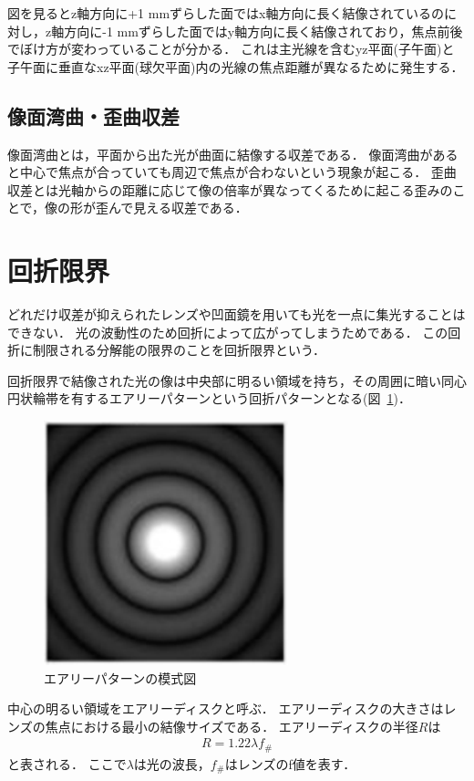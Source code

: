 図を見るとz軸方向に+1 mmずらした面ではx軸方向に長く結像されているのに対し，z軸方向に-1 mmずらした面ではy軸方向に長く結像されており，焦点前後でぼけ方が変わっていることが分かる．
これは主光線を含むyz平面(子午面)と子午面に垂直なxz平面(球欠平面)内の光線の焦点距離が異なるために発生する．

\subsection{像面湾曲・歪曲収差}
像面湾曲とは，平面から出た光が曲面に結像する収差である．
像面湾曲があると中心で焦点が合っていても周辺で焦点が合わないという現象が起こる．
歪曲収差とは光軸からの距離に応じて像の倍率が異なってくるために起こる歪みのことで，像の形が歪んで見える収差である\cite{nikon}．



\section{回折限界}
どれだけ収差が抑えられたレンズや凹面鏡を用いても光を一点に集光することはできない．
光の波動性のため回折によって広がってしまうためである．
この回折に制限される分解能の限界のことを回折限界という．

回折限界で結像された光の像は中央部に明るい領域を持ち，その周囲に暗い同心円状輪帯を有するエアリーパターンという回折パターンとなる(図\ \ref{fig:Airy_pattern})．
\begin{figure}[htbp]
    \centering
    \includegraphics[scale=1.0]{figure/Airy_pattern.pdf}
    \caption{エアリーパターンの模式図\cite{Airy}}
    \label{fig:Airy_pattern}
\end{figure}
中心の明るい領域をエアリーディスクと呼ぶ\cite{airy_disc}．
エアリーディスクの大きさはレンズの焦点における最小の結像サイズである．
エアリーディスクの半径$R$は
\begin{eqnarray}
    R = 1.22\lambda f_{\#}
\end{eqnarray}
と表される．
ここで$\lambda$は光の波長，$f_{\#}$はレンズのf値を表す\cite{airy_disc}．

